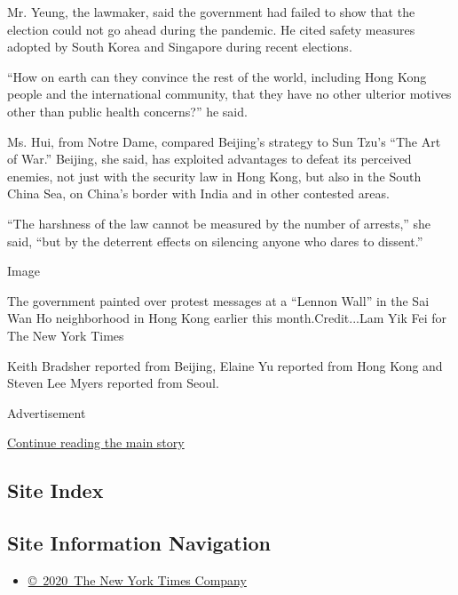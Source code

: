 Mr. Yeung, the lawmaker, said the government had failed to show that the
election could not go ahead during the pandemic. He cited safety
measures adopted by South Korea and Singapore during recent elections.

``How on earth can they convince the rest of the world, including Hong
Kong people and the international community, that they have no other
ulterior motives other than public health concerns?'' he said.

Ms. Hui, from Notre Dame, compared Beijing's strategy to Sun Tzu's ``The
Art of War.'' Beijing, she said, has exploited advantages to defeat its
perceived enemies, not just with the security law in Hong Kong, but also
in the South China Sea, on China's border with India and in other
contested areas.

``The harshness of the law cannot be measured by the number of
arrests,'' she said, ``but by the deterrent effects on silencing anyone
who dares to dissent.''

Image

The government painted over protest messages at a ``Lennon Wall'' in the
Sai Wan Ho neighborhood in Hong Kong earlier this month.Credit...Lam Yik
Fei for The New York Times

Keith Bradsher reported from Beijing, Elaine Yu reported from Hong Kong
and Steven Lee Myers reported from Seoul.

Advertisement

\protect\hyperlink{after-bottom}{Continue reading the main story}

\hypertarget{site-index}{%
\subsection{Site Index}\label{site-index}}

\hypertarget{site-information-navigation}{%
\subsection{Site Information
Navigation}\label{site-information-navigation}}

\begin{itemize}
\tightlist
\item
  \href{https://help.nytimes.com/hc/en-us/articles/115014792127-Copyright-notice}{©~2020~The
  New York Times Company}
\end{itemize}

